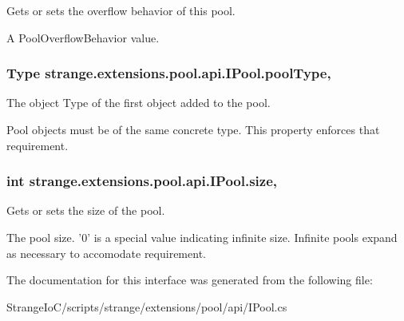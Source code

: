 Gets or sets the overflow behavior of this pool. 

A Pool\-Overflow\-Behavior value.\hypertarget{interfacestrange_1_1extensions_1_1pool_1_1api_1_1_i_pool_ab967eecf4fc76c5716cad1493d74d295}{
\subsubsection[{pool\-Type}]{\setlength{\rightskip}{0pt plus 5cm}Type strange.\-extensions.\-pool.\-api.\-I\-Pool.\-pool\-Type\hspace{0.3cm}{\ttfamily [get]}, {\ttfamily [set]}}}\label{interfacestrange_1_1extensions_1_1pool_1_1api_1_1_i_pool_ab967eecf4fc76c5716cad1493d74d295}


The object Type of the first object added to the pool. 

Pool objects must be of the same concrete type. This property enforces that requirement. \hypertarget{interfacestrange_1_1extensions_1_1pool_1_1api_1_1_i_pool_a89338069d9bf986689ceec24341fab3a}{
\subsubsection[{size}]{\setlength{\rightskip}{0pt plus 5cm}int strange.\-extensions.\-pool.\-api.\-I\-Pool.\-size\hspace{0.3cm}{\ttfamily [get]}, {\ttfamily [set]}}}\label{interfacestrange_1_1extensions_1_1pool_1_1api_1_1_i_pool_a89338069d9bf986689ceec24341fab3a}


Gets or sets the size of the pool. 

The pool size. '0' is a special value indicating infinite size. Infinite pools expand as necessary to accomodate requirement.

The documentation for this interface was generated from the following file\-:\begin{DoxyCompactItemize}
\item 
Strange\-Io\-C/scripts/strange/extensions/pool/api/I\-Pool.\-cs\end{DoxyCompactItemize}
